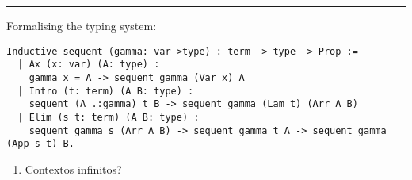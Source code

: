 \vspace{2em} \hrule \vspace{2em}

Formalising the typing system:

\begin{lstlisting}[language=Coq]
  Inductive sequent (gamma: var->type) : term -> type -> Prop := 
  | Ax (x: var) (A: type) :
    gamma x = A -> sequent gamma (Var x) A
  | Intro (t: term) (A B: type) :
    sequent (A .:gamma) t B -> sequent gamma (Lam t) (Arr A B)
  | Elim (s t: term) (A B: type) :
    sequent gamma s (Arr A B) -> sequent gamma t A -> sequent gamma (App s t) B.
\end{lstlisting}

\begin{enumerate}
\item Contextos infinitos?
\end{enumerate}

